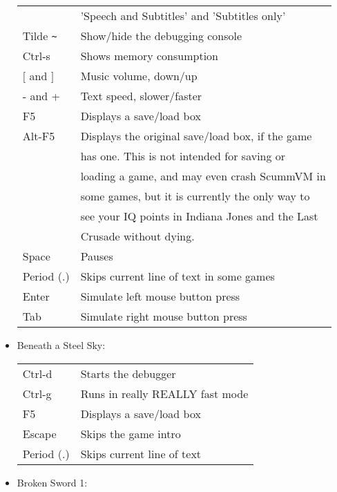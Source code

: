 \begin{itemize}
\begin{tabular}{ll}
                           & 'Speech and Subtitles' and 'Subtitles only'\\
    Tilde \verb#~#         & Show/hide the debugging console\\
    Ctrl-s                 & Shows memory consumption\\
    $[$ and $]$                & Music volume, down/up\\
    - and +                & Text speed, slower/faster\\
    F5                     & Displays a save/load box\\
    Alt-F5                 & Displays the original save/load box, if the game\\
                           & has one. This is not intended for saving or\\
                           & loading a game, and may even crash ScummVM in\\
                           & some games, but it is currently the only way to\\
                           & see your IQ points in Indiana Jones and the Last\\
                           & Crusade without dying.\\
    Space                  & Pauses\\
    Period (.)             & Skips current line of text in some games\\
    Enter                  & Simulate left mouse button press\\
    Tab                    & Simulate right mouse button press\\
  \end{tabular}
\item Beneath a Steel Sky:\\
  \begin{tabular}{ll}
    Ctrl-d                 & Starts the debugger\\
    Ctrl-g                 & Runs in really REALLY fast mode\\
    F5                     & Displays a save/load box\\
    Escape                 & Skips the game intro\\
    Period (.)             & Skips current line of text\\
  \end{tabular}
\item Broken Sword 1:\\
  \begin{tabular}{ll}

\end{tabular}
\end{itemize}
